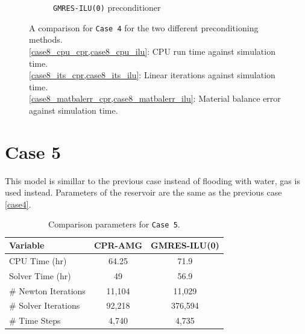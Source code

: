 \begin{figure}
\begin{subfigure}{.5\textwidth}
  \caption{\texttt{GMRES-ILU(0)} preconditioner}
	\label{case8_matbalerr_ilu}
\end{subfigure}
\caption[caption]{A comparison for \texttt{Case 4} for the two different preconditioning methods.\\\hspace{\textwidth}
		\cref{case8_cpu_cpr,case8_cpu_ilu}: CPU run time against simulation time. \\\hspace{\textwidth}
		\cref{case8_its_cpr,case8_its_ilu}: Linear iterations against simulation time.\\\hspace{\textwidth}
		\cref{case8_matbalerr_cpr,case8_matbalerr_ilu}: Material balance error against simulation time.}
\label{case8sg}
\end{figure}
\clearpage

\section{Case 5}
This model is simillar to the previous case instead of flooding with water, gas is used instead. Parameters of the reservoir
are the same as the previous case \ref{case4}.

\begin{table}[h!]
   \caption{Comparison parameters for \texttt{Case 5}.}
   \label{case5-tab}
   \small
   \centering
   \begin{tabular}{lcc}
   \toprule\toprule
   \textbf{Variable} & \textbf{CPR-AMG} & \textbf{GMRES-ILU(0)} \\
   \midrule
   CPU Time (hr) & 64.25 &  71.9 \\
   Solver Time (hr) & 49 & 56.9 \\
   \# Newton Iterations & 11,104 & 11,029 \\
   \# Solver Iterations & 92,218 & 376,594 \\
   \# Time Steps & 4,740 & 4,735 \\
   \bottomrule
   \end{tabular}
\end{table}

